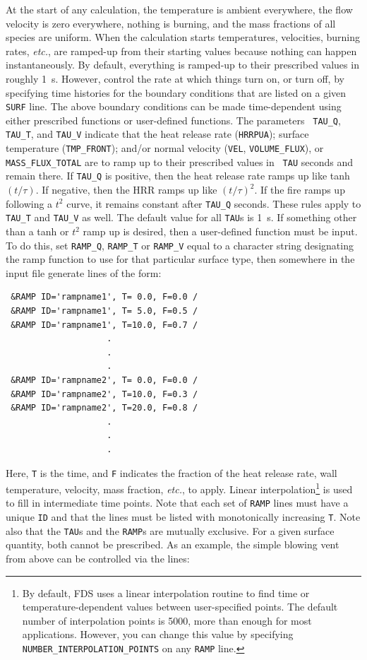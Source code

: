 \documentclass[11pt]{book}
\newcommand{\ct}{\tt\small}
\begin{document}
At the start of any calculation, the temperature is ambient
everywhere, the flow velocity is zero everywhere, nothing is burning,
and the mass fractions of all species are uniform.  When the
calculation starts temperatures, velocities, burning rates, {\em
etc.}, are ramped-up from their starting values because nothing can
happen instantaneously. By default, everything is ramped-up to their
prescribed values in roughly 1~s. However, control the rate at which
things turn on, or turn off, by specifying time histories for the
boundary conditions that are listed on a given {\ct SURF} line.  The
above boundary conditions can be made time-dependent using either
prescribed functions or user-defined functions.  The parameters {\ct
TAU\_Q}, {\ct TAU\_T}, and {\ct TAU\_V} indicate that the heat release
rate ({\ct HRRPUA}); surface temperature ({\ct TMP\_FRONT}); and/or
normal velocity ({\ct VEL}, {\ct VOLUME\_FLUX}), or {\ct
MASS\_FLUX\_TOTAL} are to ramp up to their prescribed values in {\ct
TAU} seconds and remain there.  If {\ct TAU\_Q} is positive, then the
heat release rate ramps up like tanh$(t/\tau)$. If negative, then the
HRR ramps up like $(t/\tau)^2$. If the fire ramps up following a $t^2$
curve, it remains constant after {\ct TAU\_Q} seconds.  These rules
apply to {\ct TAU\_T} and {\ct TAU\_V} as well.  The default value for
all {\ct TAU}s is 1~s.  If something other than a tanh or $t^2$ ramp
up is desired, then a user-defined function must be input. To
do this, set {\ct RAMP\_Q}, {\ct RAMP\_T} or {\ct RAMP\_V} equal to a
character string designating the ramp function to use for that
particular surface type, then somewhere in the input file generate
lines of the form:

\footnotesize
\begin{verbatim}
 &RAMP ID='rampname1', T= 0.0, F=0.0 /
 &RAMP ID='rampname1', T= 5.0, F=0.5 /
 &RAMP ID='rampname1', T=10.0, F=0.7 /
                    .
                    .
                    .
 &RAMP ID='rampname2', T= 0.0, F=0.0 /
 &RAMP ID='rampname2', T=10.0, F=0.3 /
 &RAMP ID='rampname2', T=20.0, F=0.8 /
                    .
                    .
                    .
\end{verbatim}
\normalsize

\noindent
Here, {\ct T} is the time, and {\ct F} indicates the fraction of the heat
release rate, wall temperature, velocity, mass fraction, {\em etc.}, to apply.
Linear interpolation\footnote{By default, FDS uses a linear interpolation routine to find time or temperature-dependent values between user-specified points.
The default number of interpolation points is 5000, more than enough for most applications. However, you can change this value
by specifying {\ct NUMBER\_INTERPOLATION\_POINTS} on any {\ct RAMP} line.} is used to fill in intermediate time points.
Note that each set of {\ct RAMP} lines must have a unique {\ct ID} and that the lines must
be listed with monotonically increasing {\ct T}.
Note also that the {\ct TAU}s and the {\ct RAMP}s are mutually exclusive. For a given
surface quantity, both cannot be prescribed.
As an example, the simple blowing vent from above can be controlled via the lines:
\end{document}
